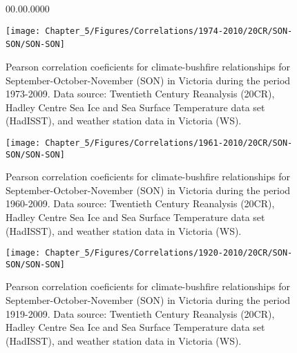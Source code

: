 \begin{figure}[h]
\begin{lyxlist}{00.00.0000}
\item [{\texttt{[image: Chapter\_5/Figures/Correlations/1974-2010/20CR/SON-SON/SON-SON]}}]~
\end{lyxlist}
\caption[Pearson correlation coeficients for climate-bushfire relationships
for September-October-November (SON) in Victoria during the period
1973-2009]{Pearson correlation coeficients for climate-bushfire relationships
for September-October-November (SON) in Victoria during the period
1973-2009. Data source: Twentieth Century Reanalysis (20CR), Hadley
Centre Sea Ice and Sea Surface Temperature data set (HadISST), and
weather station data in Victoria (WS). \label{fig:Pearson correlation coeficients for climate-bushfire relationships for September-October-November in Victoria during the period 1973-2009}}


\end{figure}


\begin{figure}[h]
\noindent \begin{centering}
\texttt{[image: Chapter\_5/Figures/Correlations/1961-2010/20CR/SON-SON/SON-SON]}
\par\end{centering}

\caption[Pearson correlation coeficients for climate-bushfire relationships
for September-October-November (SON) in Victoria during the period
1960-2009]{Pearson correlation coeficients for climate-bushfire relationships
for September-October-November (SON) in Victoria during the period
1960-2009. Data source: Twentieth Century Reanalysis (20CR), Hadley
Centre Sea Ice and Sea Surface Temperature data set (HadISST), and
weather station data in Victoria (WS). \label{fig:Pearson correlation coeficients for climate-bushfire relationships for September-October-November in Victoria during the period 1960-2009}}
\end{figure}


\begin{figure}[h]
\noindent \begin{centering}
\texttt{[image: Chapter\_5/Figures/Correlations/1920-2010/20CR/SON-SON/SON-SON]}
\par\end{centering}

\caption[Pearson correlation coeficients for climate-bushfire relationships
for September-October-November (SON) in Victoria during the period
1919-2009]{Pearson correlation coeficients for climate-bushfire relationships
for September-October-November (SON) in Victoria during the period
1919-2009. Data source: Twentieth Century Reanalysis (20CR), Hadley
Centre Sea Ice and Sea Surface Temperature data set (HadISST), and
weather station data in Victoria (WS). \label{fig:Pearson correlation coeficients for climate-bushfire relationships for September-October-November in Victoria during the period 1919-2009}}


\end{figure}



